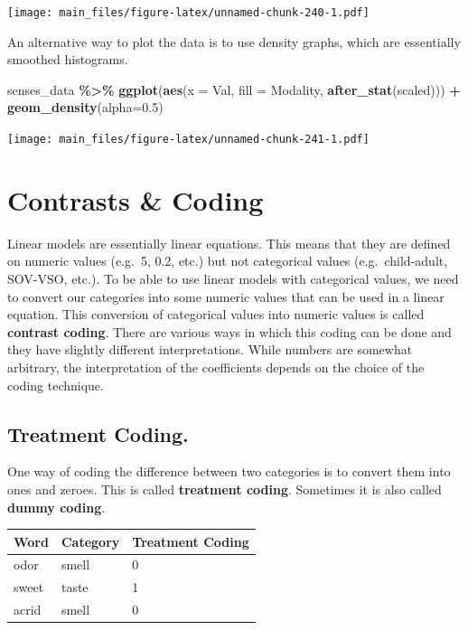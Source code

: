 \documentclass[
]{book}
\newenvironment{Shaded}{\begin{snugshade}}{\end{snugshade}}
\newcommand{\AttributeTok}[1]{\textcolor[rgb]{0.13,0.29,0.53}{#1}}
\newcommand{\FloatTok}[1]{\textcolor[rgb]{0.00,0.00,0.81}{#1}}
\newcommand{\FunctionTok}[1]{\textcolor[rgb]{0.13,0.29,0.53}{\textbf{#1}}}
\newcommand{\NormalTok}[1]{#1}
\newcommand{\SpecialCharTok}[1]{\textcolor[rgb]{0.81,0.36,0.00}{\textbf{#1}}}
\begin{document}
\texttt{[image: main\_files/figure-latex/unnamed-chunk-240-1.pdf]}

An alternative way to plot the data is to use density graphs, which are essentially smoothed histograms.

\begin{Shaded}
\begin{Highlighting}[]
\NormalTok{senses\_data }\SpecialCharTok{\%\textgreater{}\%} \FunctionTok{ggplot}\NormalTok{(}\FunctionTok{aes}\NormalTok{(}\AttributeTok{x =}\NormalTok{ Val, }\AttributeTok{fill =}\NormalTok{ Modality, }\FunctionTok{after\_stat}\NormalTok{(scaled))) }\SpecialCharTok{+} 
  \FunctionTok{geom\_density}\NormalTok{(}\AttributeTok{alpha=}\FloatTok{0.5}\NormalTok{) }
\end{Highlighting}
\end{Shaded}

\texttt{[image: main\_files/figure-latex/unnamed-chunk-241-1.pdf]}

\section{Contrasts \& Coding}\label{contrasts-coding}

Linear models are essentially linear equations. This means that they are defined on numeric values (e.g.~5, 0.2, etc.) but not categorical values (e.g.~child-adult, SOV-VSO, etc.). To be able to use linear models with categorical values, we need to convert our categories into some numeric values that can be used in a linear equation. This conversion of categorical values into numeric values is called \textbf{contrast coding}. There are various ways in which this coding can be done and they have slightly different interpretations. While numbers are somewhat arbitrary, the interpretation of the coefficients depends on the choice of the coding technique.

\subsection{Treatment Coding.}\label{treatment-coding.}

One way of coding the difference between two categories is to convert them into ones and zeroes. This is called \textbf{treatment coding}. Sometimes it is also called \textbf{dummy coding}.

\begin{longtable}[]{@{}lll@{}}
\toprule\noalign{}
\textbf{Word} & \textbf{Category} & \textbf{Treatment Coding} \\
\midrule\noalign{}
\endhead
\bottomrule\noalign{}
\endlastfoot
odor & smell & 0 \\
sweet & taste & 1 \\
acrid & smell & 0 \\
\end{longtable}
\end{document}
